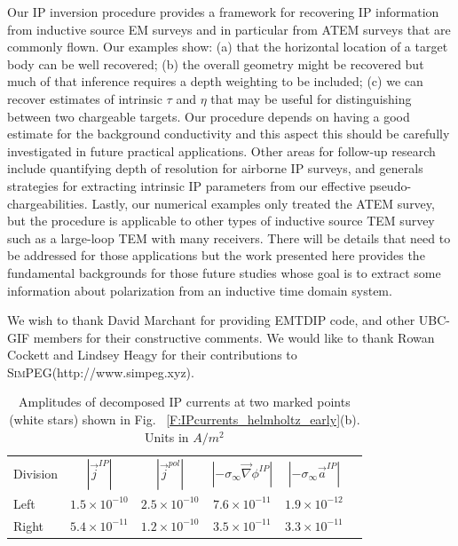 \documentclass[extra,mreferee]{gji}
\newcommand{\SimPEG}{\textsc{SimPEG}\xspace}
\newcommand{\grad}{\vec \nabla}
\newcommand{\siginf}{\sigma_\infty}
\renewcommand {\j}  { {\vec j} }
\begin{document}
Our IP inversion procedure provides a framework for recovering IP information from inductive source EM surveys and in particular from ATEM surveys that are commonly flown. Our examples show: (a)  that the horizontal location of a target body can be well recovered; (b) the overall geometry might be recovered but much of that inference requires a depth weighting to be included; (c)  we can recover estimates of intrinsic $\tau$ and $\eta$ that may be useful for distinguishing between two chargeable targets. Our procedure depends on having a good estimate for the background conductivity and this aspect this should be carefully investigated in future practical applications.  Other areas for follow-up research include quantifying  depth of resolution for  airborne IP surveys, and generals strategies for extracting  intrinsic IP parameters from our effective pseudo-chargeabilities.  
Lastly, our numerical examples  only treated the ATEM survey, but the procedure is applicable to other types of inductive source TEM survey such as a large-loop TEM with many receivers. There will be details that need to be addressed for those applications but the work presented here provides the  fundamental backgrounds for those future studies whose goal is to extract some information about polarization from an inductive time domain system. 

\begin{acknowledgments}
  We wish to thank David Marchant for providing EMTDIP code, and other UBC-GIF members for their constructive comments. We would like to thank Rowan Cockett and Lindsey Heagy for their contributions to \SimPEG (http://www.simpeg.xyz). 
\end{acknowledgments}



\clearpage

\begin{table}
 \caption{Amplitudes of decomposed IP currents at two marked points (white stars) shown in Fig. ~\ref{F:IPcurrents_helmholtz_early}(b). Units in $A/m^2$}
 \label{T:DecompjIPcond}
 \begin{tabular}{@{}lccccc}
  Division & $| \j^{IP} |$ & $| \j^{pol} |$ & $| -\siginf\grad \phi^{IP} |$ & $| -\siginf\vec{a}^{IP} |$ \\
  Left  & $1.5\times 10^{-10}$ & $2.5\times 10^{-10}$ & $7.6\times 10^{-11}$ & $1.9\times 10^{-12}$ \\
  Right & $5.4\times 10^{-11}$ & $1.2\times 10^{-10}$ & $3.5\times 10^{-11}$ & $3.3\times 10^{-11}$ \\
 \end{tabular}
\end{table}
\end{document}
